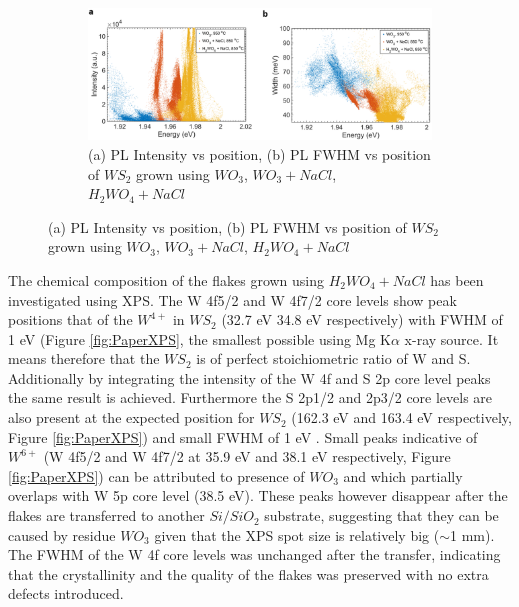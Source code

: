 \begin{figure}[!h]
\begin{center}
		\begin{subfigure}[b]{0.8\textwidth}
			\includegraphics[scale=0.3]{PaperSIScatterComparison.png}
			\caption{(a) PL Intensity vs position, (b) PL FWHM vs position of $WS_2$ grown using $WO_3$, $WO_3+NaCl$, $H_2WO_4+NaCl$}
			\label{fig:PaperSIScatterComparison}
		\end{subfigure}
	\end{center}
\end{figure}

The chemical composition of the flakes grown using $H_2WO_4 + NaCl$ has been investigated using XPS. The W 4f5/2 and W 4f7/2 core levels show peak positions that of the $W^{4+}$ in $WS_2$ \cite{Cattelan2015}\cite{Martinez2004} (32.7 eV 34.8 eV respectively) with FWHM of 1 eV (Figure \ref{fig:PaperXPS}, the smallest possible using Mg K$\alpha$ x-ray source. It means therefore that the $WS_2$ is of perfect stoichiometric ratio of W and S. Additionally by integrating the intensity of the W 4f and S 2p core level peaks the same result is achieved. Furthermore the S 2p1/2 and 2p3/2 core levels are also present at the expected position for $WS_2$ (162.3 eV and 163.4 eV respectively, Figure \ref{fig:PaperXPS}) and small FWHM of 1 eV \cite{Martinez2004}. Small peaks indicative of $W^{6+}$ (W 4f5/2 and W 4f7/2 at 35.9 eV and 38.1 eV respectively, Figure \ref{fig:PaperXPS}) can be attributed to presence of $WO_3$ and which partially overlaps with W 5p core level (38.5 eV). These peaks however disappear after the flakes are transferred to another $Si/SiO_2$ substrate, suggesting that they can be caused by residue $WO_3$ given that the XPS spot size is relatively big ({$\sim$}1 mm). The FWHM of the W 4f core levels was unchanged after the transfer, indicating that the crystallinity and the quality of the flakes was preserved with no extra defects introduced.

